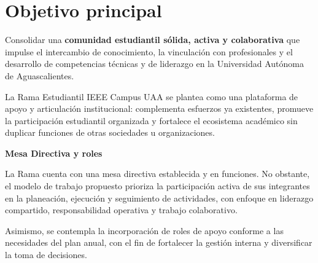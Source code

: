\documentclass[11pt,a4paper]{article}
\begin{document}



\section{Objetivo principal}

Consolidar una \textbf{comunidad estudiantil sólida, activa y colaborativa} que impulse el intercambio de conocimiento, la vinculación con profesionales y el desarrollo de competencias técnicas y de liderazgo en la Universidad Autónoma de Aguascalientes.

La Rama Estudiantil IEEE Campus UAA se plantea como una plataforma de apoyo y articulación institucional: complementa esfuerzos ya existentes, promueve la participación estudiantil organizada y fortalece el ecosistema académico sin duplicar funciones de otras sociedades u organizaciones.




\textbf{Mesa Directiva y roles}

La Rama cuenta con una mesa directiva establecida y en funciones. No obstante, el modelo de trabajo propuesto prioriza la participación activa de sus integrantes en la planeación, ejecución y seguimiento de actividades, con enfoque en liderazgo compartido, responsabilidad operativa y trabajo colaborativo.

Asimismo, se contempla la incorporación de roles de apoyo conforme a las necesidades del plan anual, con el fin de fortalecer la gestión interna y diversificar la toma de decisiones.
\end{document}
